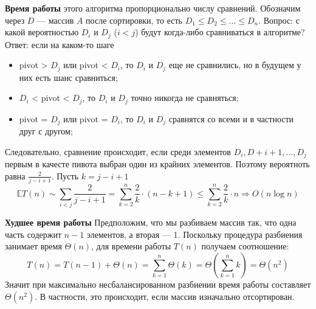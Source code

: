 \par \textbf{Время работы} этого алгоритма пропорционально числу сравнений. Обозначим через $D$ — массив $A$ после сортировки, то есть $D_1\leq D_2\leq \ldots \leq D_n$. Вопрос: с какой вероятностью $D_i$ и $D_j$ ($i<j$) будут когда-либо сравниваться в алгоритме? \newline Ответ: если на каком-то шаге 
\begin{itemize}
    \item pivot > $D_j$ или pivot < $D_i$, то $D_i$ и $D_j$ еще не сравнились, но в будущем у них есть шанс сравниться;
    \item $D_i$ < pivot < $D_j$, то $D_i$ и $D_j$ точно никогда не сравняться;
    \item pivot = $D_j$ или pivot = $D_i$, то $D_i$ и $D_j$ сравнятся со всеми и в частности друг с другом;
\end{itemize}
Следовательно, сравнение происходит, если среди элементов $D_i , D+{i+1}, \ldots , D_j$ первым в качесте пивота выбран один из крайних элементов. Поэтому вероятноть равна $\frac{2}{j-i+1}$. Пусть $k=j-i+1$
$$\mathbb{E}T(n) \sim \sum_{i<j}\frac{2}{j-i+1}=\sum_{k=2}^{n}\frac{2}{k}\cdot (n-k+1)\leq \sum_{k=2}^{n}\frac{2}{k}\cdot n \Rightarrow O(n\log n)$$

\par \textbf{Худшее время работы}
\newline Предположим, что мы разбиваем массив так, что одна часть содержит $n-1$ элементов, а вторая — 1. Поскольку процедура разбиения занимает время $\Theta(n)$, для времени работы $T(n)$ получаем соотношение:
$$T(n)=T(n-1)+\Theta(n)=\sum_{k=1}^{n}\Theta(k)=\Theta(\sum_{k=1}^{n}k)=\Theta(n^2)$$
Значит при максимально несбалансированном разбиении время работы составляет $\Theta(n^2)$. В частности, это происходит, если массив изначально отсортирован.